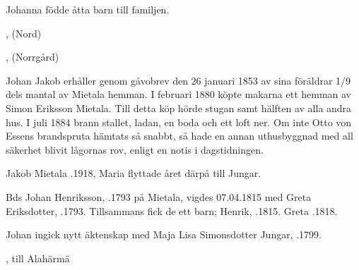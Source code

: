 Johanna födde åtta barn till familjen.
\begin{jhchildren}
  \item {}, (Nord)
  \item {}
  \item {}
  \item {}
  \item {}
  \item {}
  \item {}, (Norrgård)
  \item {}
\end{jhchildren}
Johan Jakob erhåller genom gåvobrev den 26 januari 1853 av sina föräldrar 1/9 dels mantal av Mietala hemman. I februari 1880 köpte makarna ett hemman av Simon Eriksson Mietala. Till detta köp hörde stugan samt hälften av alla andra hus. I juli 1884 brann stallet, ladan, en boda och ett loft ner. Om inte Otto von Essens brandspruta hämtats så snabbt, så hade en annan uthusbyggnad med all säkerhet blivit lågornas rov, enligt en notis i dagstidningen.

Jakob Mietala .1918, Maria flyttade året därpå till Jungar.


Bds Johan Henriksson, .1793 på Mietala, vigdes 07.04.1815 med Greta Eriksdotter, .1793. Tillsammans fick de ett barn; Henrik, .1815.
Greta .1818.

Johan ingick nytt äktenskap med Maja Lisa Simonsdotter Jungar, .1799.
\begin{jhchildren}
  \item {}
  \item {}
  \item {}
  \item {}
  \item {}
  \item {}, till Alahärmä
  \item {}
  \item {}
\end{jhchildren}

